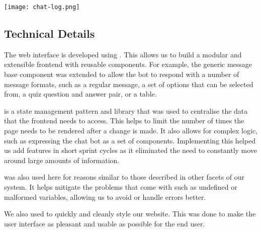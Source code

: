 \texttt{[image: chat-log.png]}

\subsection{Technical Details}
The web interface is developed using . This allows us to build a modular and extensible frontend with reusable components. For example, the generic message base component was extended to allow the bot to respond with a number of message formats, such as a regular message, a set of options that can be selected from, a quiz question and answer pair, or a table.

 is a state management pattern and library that was used to centralise the data that the frontend needs to access. This helps to limit the number of times the page needs to be rendered after a change is made. It also allows for complex logic, such as expressing the chat bot as a set of components. Implementing this helped us add features in short sprint cycles as it eliminated the need to constantly move around large amounts of information.

 was also used here for reasons similar to those described in other facets of our system. It helps mitigate the problems that come with  such as undefined or malformed variables, allowing us to avoid or handle errors better.

We also used  to quickly and cleanly style our website. This was done to make the user interface as pleasant and usable as possible for the end user.

\newpage

